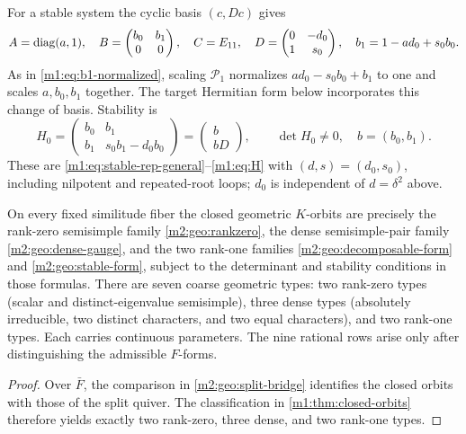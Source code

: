 For a stable system the cyclic basis $(c,Dc)$ gives
\begin{equation}\label{m2:geo:stable-form}
 A=\operatorname{diag}(a,1),\quad
 B=\begin{pmatrix}b_0&b_1\\0&0\end{pmatrix},\quad C=E_{11},\quad
 D=\begin{pmatrix}0&-d_0\\1&s_0\end{pmatrix},\quad
 b_1=1-ad_0+s_0b_0.
\end{equation}
As in \eqref{m1:eq:b1-normalized}, scaling $\mathcal P_1$ normalizes
$ad_0-s_0b_0+b_1$ to one and scales $a,b_0,b_1$ together.
The target Hermitian form below incorporates this change of basis. Stability is
\begin{equation}\label{m2:geo:stable-pairing}
 H_0=\begin{pmatrix}b_0&b_1\\b_1&s_0b_1-d_0b_0\end{pmatrix}
     =\begin{pmatrix}b\\bD\end{pmatrix},\qquad\det H_0\ne0,
 \quad b=(b_0,b_1).
\end{equation}
These are \eqref{m1:eq:stable-rep-general}--\eqref{m1:eq:H} with
$(d,s)=(d_0,s_0)$, including nilpotent and repeated-root loops;
$d_0$ is independent of $d=\delta^2$ above.

\begin{theorem}\label{m2:geo:classification}
On every fixed similitude fiber the closed geometric $K$-orbits
are precisely the rank-zero semisimple family
\eqref{m2:geo:rankzero}, the dense semisimple-pair family
\eqref{m2:geo:dense-gauge}, and the two rank-one families
\eqref{m2:geo:decomposable-form} and \eqref{m2:geo:stable-form},
subject to the determinant and stability conditions in those formulas.
There are seven coarse geometric types: two rank-zero types
(scalar and distinct-eigenvalue semisimple), three dense types
(absolutely irreducible, two distinct characters, and two equal
characters), and two rank-one types. Each carries continuous
parameters. The nine rational rows arise only after distinguishing
the admissible $F$-forms.
\end{theorem}

\begin{proof}
Over $\bar F$, the comparison in \cref{m2:geo:split-bridge}
identifies the closed orbits with those of the split quiver.
The classification in \cref{m1:thm:closed-orbits} therefore yields
exactly two rank-zero, three dense, and two rank-one types.
\end{proof}

